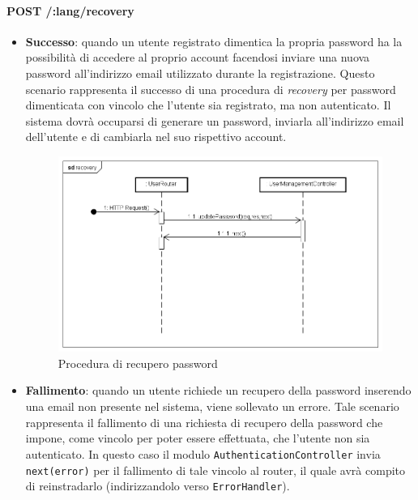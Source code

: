 \paragraph{POST /:lang/recovery}
\begin{itemize}
\item \textbf{Successo}: quando un utente registrato dimentica la propria password ha la possibilità di accedere al proprio account facendosi inviare una nuova password all'indirizzo email utilizzato durante la registrazione. Questo scenario rappresenta il successo di una procedura di \textit{recovery} per password dimenticata con vincolo che l'utente sia registrato, ma non autenticato. Il sistema dovrà occuparsi di generare un password, inviarla all'indirizzo email dell'utente e di cambiarla nel suo rispettivo account.

\label{Procedura di recupero password}
\begin{figure}[ht]
	\centering
	\includegraphics[scale=0.40]{UML/DiagrammiDiSequenza/Back-end/POST__lang_recovery_success.png}
	\caption{Procedura di recupero password}
\end{figure}
\FloatBarrier

\item \textbf{Fallimento}: quando un utente richiede un recupero della password inserendo una email non presente nel sistema, viene sollevato un errore. Tale scenario rappresenta il fallimento di una richiesta di recupero della password che impone, come vincolo per poter essere effettuata, che l'utente non sia autenticato. In questo caso il modulo \texttt{AuthenticationController} invia \texttt{next(error)} per il fallimento di tale vincolo al router, il quale avrà compito di reinstradarlo (indirizzandolo verso \texttt{ErrorHandler}).


\end{itemize}
